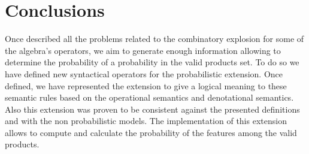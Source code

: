 \section{Conclusions}
\label{section:jstat:concs}

Once described all the problems related to the combinatory explosion
for some of the algebra's operators, we aim to generate enough information
allowing to determine the probability of a probability in the valid
products set.
%
To do so we have defined new syntactical operators for the probabilistic
extension. Once defined, we have represented the extension to give a logical
meaning to these semantic rules based on the operational semantics
and denotational semantics.
%
Also this extension was proven to be consistent against the presented definitions
and with the non probabilistic models.
%
The implementation of this extension allows to compute and calculate the probability of the features among the valid products.

